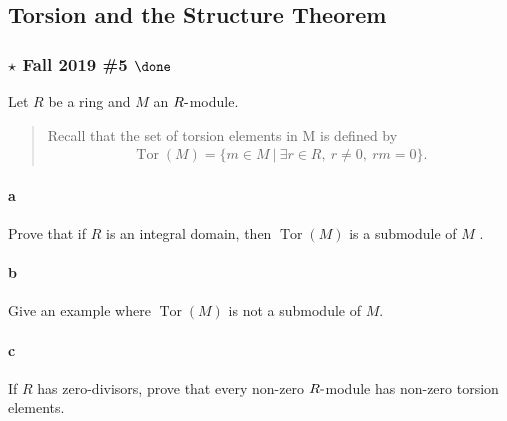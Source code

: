 \hypertarget{torsion-and-the-structure-theorem}{%
\subsection{Torsion and the Structure
Theorem}\label{torsion-and-the-structure-theorem}}

\hypertarget{star-fall-2019-5-done}{%
\subsubsection{\texorpdfstring{\(\star\) Fall 2019 \#5
\(\done\)}{\textbackslash star Fall 2019 \#5 \textbackslash done}}\label{star-fall-2019-5-done}}

Let \(R\) be a ring and \(M\) an \(R{\hbox{-}}\)module.

\begin{quote}
Recall that the set of torsion elements in M is defined by
\begin{align*}
\operatorname{Tor}(M) = \{m \in M {~\mathrel{\Big|}~}\exists r \in R, ~r \neq 0, ~rm = 0\}
.\end{align*}
\end{quote}

\hypertarget{a-88}{%
\paragraph{a}\label{a-88}}

Prove that if \(R\) is an integral domain, then
\(\operatorname{Tor}(M )\) is a submodule of \(M\) .

\hypertarget{b-78}{%
\paragraph{b}\label{b-78}}

Give an example where \(\operatorname{Tor}(M )\) is not a submodule of
\(M\).

\hypertarget{c-50}{%
\paragraph{c}\label{c-50}}

If \(R\) has zero-divisors, prove that every non-zero
\(R{\hbox{-}}\)module has non-zero torsion elements.

